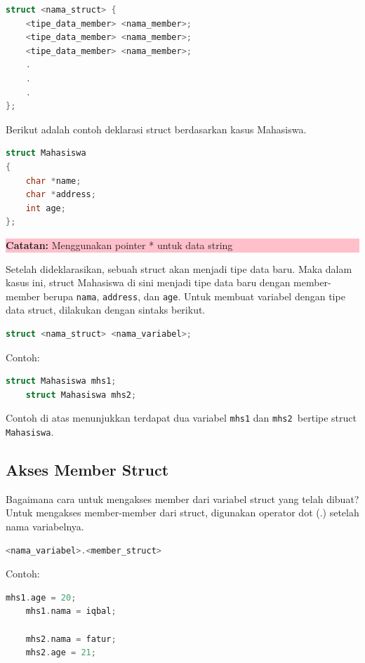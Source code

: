 \begin{lstlisting}[language=c]
struct <nama_struct> {
    <tipe_data_member> <nama_member>;
    <tipe_data_member> <nama_member>;
    <tipe_data_member> <nama_member>;
    .
    .
    .
};
\end{lstlisting}

Berikut adalah contoh deklarasi struct berdasarkan kasus Mahasiswa.
\begin{lstlisting}[language=c]
struct Mahasiswa
{
    char *name;
    char *address;
    int age;
};
\end{lstlisting}
\begin{center}
    \colorbox{pink}{\parbox{0.8\linewidth}{\textbf{Catatan:}  Menggunakan pointer * untuk data string}}
\end{center}

Setelah dideklarasikan, sebuah struct akan menjadi tipe data baru.
Maka dalam kasus ini, struct Mahasiswa di sini menjadi tipe data baru dengan member-member berupa \verb|nama|, \verb|address|, dan \verb|age|.
Untuk membuat variabel dengan tipe data struct, dilakukan dengan sintaks berikut.

\begin{lstlisting}[language=c]
    struct <nama_struct> <nama_variabel>;
\end{lstlisting}

Contoh:
\begin{lstlisting}[language=c]
    struct Mahasiswa mhs1;
    struct Mahasiswa mhs2;
\end{lstlisting}
Contoh di atas menunjukkan terdapat dua variabel \verb|mhs1| dan \verb|mhs2 |bertipe struct \verb|Mahasiswa|.

\subsection{Akses Member Struct}
Bagaimana cara untuk mengakses member dari variabel struct yang telah dibuat? \\
Untuk mengakses member-member dari struct, digunakan operator dot (.) setelah nama variabelnya.
\begin{lstlisting}[language=c]
    <nama_variabel>.<member_struct>
\end{lstlisting}

Contoh:
\begin{lstlisting}[language=c]
    mhs1.age = 20;
    mhs1.nama = iqbal;
    
    mhs2.nama = fatur;
    mhs2.age = 21;
\end{lstlisting}

